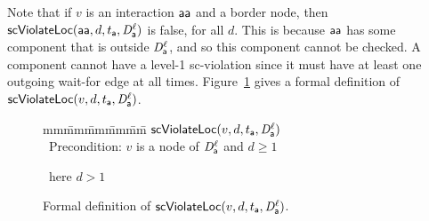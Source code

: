 \ee
\ed
%
Note that if $v$ is an interaction $\mathsf{aa}$ and a border node, then
$\mathsf{scViolateLoc}(\mathsf{aa},d,t_{\mathsf{a}},\mathit{D}_{\mathsf{a}}^{\ell})$ is false, for all $d$.  This is because $\mathsf{aa}$ has some
component that is outside $\mathit{D}_{\mathsf{a}}^{\ell}$, and so this component cannot be checked.  A component
cannot have a level-1 sc-violation since it must
have at least one outgoing wait-for edge at all times.
%
Figure~\ref{fig:scViolateLoc} gives a formal definition of $\mathsf{scViolateLoc}(v,d,t_{\mathsf{a}},\mathit{D}_{\mathsf{a}}^{\ell})$.



 
\begin{figure}[ht]
\setcounter{lctr}{0}
\begin{tabbing}
mm\= mm\= mm\= mm\= mm\=\kill
$\mathsf{scViolateLoc}(v,d,t_{\mathsf{a}},\mathit{D}_{\mathsf{a}}^{\ell})$\\
\cmnt\ Precondition: $v$ is a node of $\mathit{D}_{\mathsf{a}}^{\ell}$ and $d \ge 1$\\

       \lit{\ELSE\ \RETURNE{\fff}}
       \lit{\FI}
\lio{\FI}

\cmnt\ here $d > 1$\\

        \lit{\RETURNE{\ttt}}

      \lit{\RETURNE{\ttt}}

\lio{\ELSE\ \RETURNE{\fff}}
\lio{\FI}
\end{tabbing}
\caption{Formal definition of $\mathsf{scViolateLoc}(v,d,t_{\mathsf{a}},\mathit{D}_{\mathsf{a}}^{\ell})$.}
\label{fig:scViolateLoc}
\end{figure}



